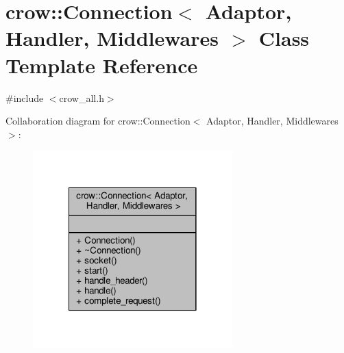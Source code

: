 \hypertarget{classcrow_1_1_connection}{\section{crow\-:\-:Connection$<$ Adaptor, Handler, Middlewares $>$ Class Template Reference}
\label{classcrow_1_1_connection}
}


{\ttfamily \#include $<$crow\-\_\-all.\-h$>$}



Collaboration diagram for crow\-:\-:Connection$<$ Adaptor, Handler, Middlewares $>$\-:
\nopagebreak
\begin{figure}[H]
\begin{center}
\leavevmode
\includegraphics[width=218pt]{classcrow_1_1_connection__coll__graph}
\end{center}
\end{figure}

